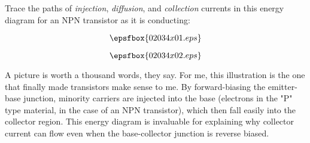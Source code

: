 

Trace the paths of {\it injection}, {\it diffusion}, and {\it collection} currents in this energy diagram for an NPN transistor as it is conducting:

$$\epsfbox{02034x01.eps}$$







$$\epsfbox{02034x02.eps}$$







A picture is worth a thousand words, they say.  For me, this illustration is the one that finally made transistors make sense to me.  By forward-biasing the emitter-base junction, minority carriers are injected into the base (electrons in the "P" type material, in the case of an NPN transistor), which then fall easily into the collector region.  This energy diagram is invaluable for explaining why collector current can flow even when the base-collector junction is reverse biased.




